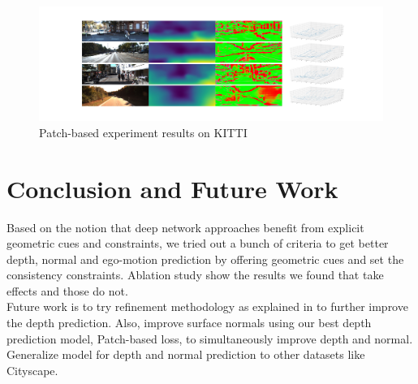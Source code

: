 \documentclass[10pt,twocolumn,letterpaper]{article}
\begin{document}
\begin{figure}[t!]
  \includegraphics[width=\linewidth]{patch_based.jpg}
  \caption{Patch-based experiment results on KITTI}
  \label{fig:KITTI}
\end{figure}


\section{Conclusion and Future Work}
Based on the notion that deep network approaches benefit from explicit geometric cues and constraints, we tried out a bunch of criteria to get better depth, normal and ego-motion prediction by offering geometric cues and set the consistency constraints. Ablation study show the results we found that take effects and those do not. \\
Future work is to try refinement methodology as explained in \cite{casser2018depth} to further improve the depth prediction. Also, improve surface normals using our best depth prediction model, 
Patch-based loss, to simultaneously improve depth and normal.
Generalize model for depth and normal prediction to other datasets like Cityscape.



\end{document}
